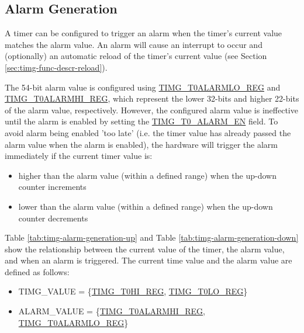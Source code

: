 \documentclass[main\_\_EN.tex]{subfiles}
\begin{document}
\subsection{Alarm Generation}
A timer can be configured to trigger an alarm when the timer's current value matches the alarm value. An alarm will cause an interrupt to occur and (optionally) an automatic reload of the timer's current value (see Section \ref{sec:timg-func-descr-reload}). 

The 54-bit alarm value is configured using \hyperref[regdesc:TIMGTXALARMLOREG]{TIMG\_T0ALARMLO\_REG} and \hyperref[regdesc:TIMGTXALARMHIREG]{TIMG\_T0ALARMHI\_REG}, which represent the lower 32-bits and higher 22-bits of the alarm value, respectively. However, the configured alarm value is ineffective until the alarm is enabled by setting the \hyperref[fielddesc:TIMGTXALARMEN]{TIMG\_T0\_ALARM\_EN} field. To avoid alarm being enabled 'too late' (i.e. the timer value has already passed the alarm value when the alarm is enabled), the hardware will trigger the alarm immediately if the current timer value is:
\begin{itemize}
    \item higher than the alarm value (within a defined range) when the up-down counter increments
    \item lower than the alarm value (within a defined range) when the up-down counter decrements
\end{itemize}

Table \ref{tab:timg-alarm-generation-up} and Table \ref{tab:timg-alarm-generation-down} show the relationship between the current value of the timer, the alarm value, and when an alarm is triggered. The current time value and the alarm value are defined as follows:

\begin{itemize}
    \item TIMG\_VALUE = \{\hyperref[regdesc:TIMGTXHIREG]{TIMG\_T0HI\_REG}, \hyperref[regdesc:TIMGTXLOREG]{TIMG\_T0LO\_REG}\}
    \item ALARM\_VALUE = \{\hyperref[regdesc:TIMGTXALARMHIREG]{TIMG\_T0ALARMHI\_REG}, \hyperref[regdesc:TIMGTXALARMLOREG]{TIMG\_T0ALARMLO\_REG}\}
\end{itemize}
\end{document}
